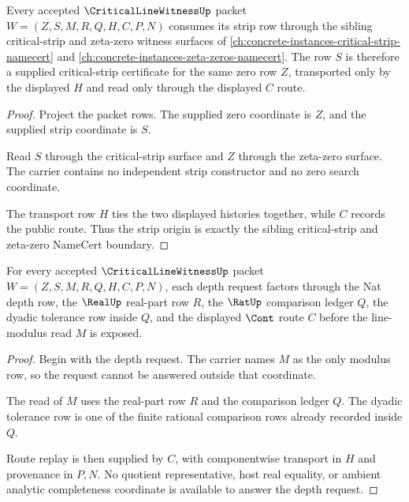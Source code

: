 \begin{theorem}
\label{thm:critical-line-witness-critical-strip-origin}
Every accepted $\CriticalLineWitnessUp$ packet $W=(Z,S,M,R,Q,H,C,P,N)$ consumes its strip row through the sibling critical-strip and zeta-zero witness surfaces of \autoref{ch:concrete-instances-critical-strip-namecert} and \autoref{ch:concrete-instances-zeta-zeros-namecert}. The row $S$ is therefore a supplied critical-strip certificate for the same zero row $Z$, transported only by the displayed $H$ and read only through the displayed $C$ route.
\end{theorem}
\begin{proof}
Project the packet rows. The supplied zero coordinate is $Z$, and the supplied strip coordinate is $S$.

Read $S$ through the critical-strip surface and $Z$ through the zeta-zero surface. The carrier contains no independent strip constructor and no zero search coordinate.

The transport row $H$ ties the two displayed histories together, while $C$ records the public route. Thus the strip origin is exactly the sibling critical-strip and zeta-zero NameCert boundary.
\end{proof}

\begin{theorem}
\label{thm:critical-line-witness-modulus-depth-routing}
For every accepted $\CriticalLineWitnessUp$ packet $W=(Z,S,M,R,Q,H,C,P,N)$, each depth request factors through the Nat depth row, the $\RealUp$ real-part row $R$, the $\RatUp$ comparison ledger $Q$, the dyadic tolerance row inside $Q$, and the displayed $\Cont$ route $C$ before the line-modulus read $M$ is exposed.
\end{theorem}
\begin{proof}
Begin with the depth request. The carrier names $M$ as the only modulus row, so the request cannot be answered outside that coordinate.

The read of $M$ uses the real-part row $R$ and the comparison ledger $Q$. The dyadic tolerance row is one of the finite rational comparison rows already recorded inside $Q$.

Route replay is then supplied by $C$, with componentwise transport in $H$ and provenance in $P,N$. No quotient representative, host real equality, or ambient analytic completeness coordinate is available to answer the depth request.
\end{proof}

